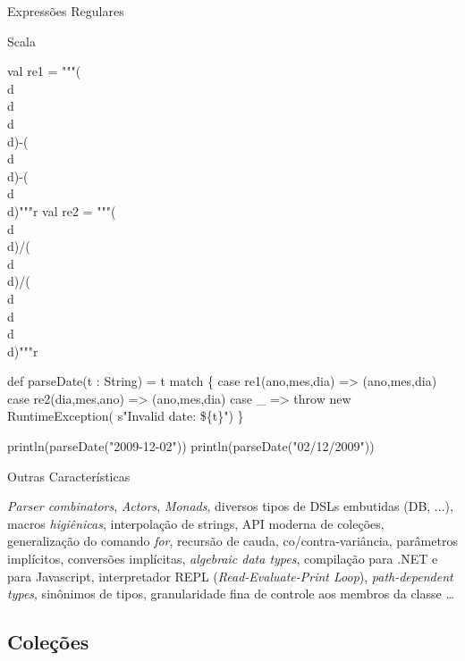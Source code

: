 \documentclass[12pt]{beamer}
\newenvironment{scala}{
\begin{block}{Scala} \begin{semiverbatim}
}{
\end{semiverbatim} \end{block}
}
\begin{document}
\begin{frame}[fragile]{Expressões Regulares}
\footnotesize
\begin{scala}
val re1 = """(\\d\\d\\d\\d)-(\\d\\d)-(\\d\\d)"""r
val re2 = """(\\d\\d)/(\\d\\d)/(\\d\\d\\d\\d)"""r

def parseDate(t : String) = t match \{
  case re1(ano,mes,dia) => (ano,mes,dia)
  case re2(dia,mes,ano) => (ano,mes,dia)
  case _ => 
    throw new RuntimeException(
        s"Invalid date: \$\{t\}")
\}

println(parseDate("2009-12-02"))
println(parseDate("02/12/2009"))
\end{scala}
\end{frame}

\begin{frame}{Outras Características}

\emph{Parser combinators}, \emph{Actors}, \emph{Monads},
diversos tipos de DSLs embutidas (DB, ...),
macros \emph{higiênicas},
interpolação de strings,
API moderna de coleções,
generalização do comando \emph{for},
recursão de cauda,
co/contra-variância,
parâmetros implícitos,
conversões implícitas,
\emph{algebraic data types},
compilação para .NET e para Javascript,
interpretador REPL (\emph{Read-Evaluate-Print Loop}),
\emph{path-dependent types},
sinônimos de tipos,
granularidade fina de controle aos membros da classe
\dots
\end{frame}

\subsection{Coleções} %
\end{document}
